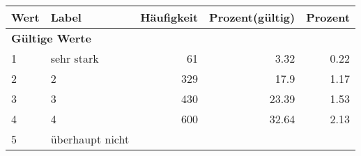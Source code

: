      \begin{longtable}{lXrrr}
     \toprule
     \textbf{Wert} & \textbf{Label} & \textbf{Häufigkeit} & \textbf{Prozent(gültig)} & \textbf{Prozent} \\
     \endhead
     \midrule
     \multicolumn{5}{l}{\textbf{Gültige Werte}}\\

     1 &
     \multicolumn{1}{X}{ sehr stark   } &


       \num{61} &
       \num[round-mode=places,round-precision=2]{3.32} &
         \num[round-mode=places,round-precision=2]{0.22} \\

     2 &
     \multicolumn{1}{X}{ 2   } &


       \num{329} &
       \num[round-mode=places,round-precision=2]{17.9} &
         \num[round-mode=places,round-precision=2]{1.17} \\

     3 &
     \multicolumn{1}{X}{ 3   } &


       \num{430} &
       \num[round-mode=places,round-precision=2]{23.39} &
         \num[round-mode=places,round-precision=2]{1.53} \\

     4 &
     \multicolumn{1}{X}{ 4   } &


       \num{600} &
       \num[round-mode=places,round-precision=2]{32.64} &
         \num[round-mode=places,round-precision=2]{2.13} \\

     5 &
     \multicolumn{1}{X}{ überhaupt nicht   } &



\end{longtable}
